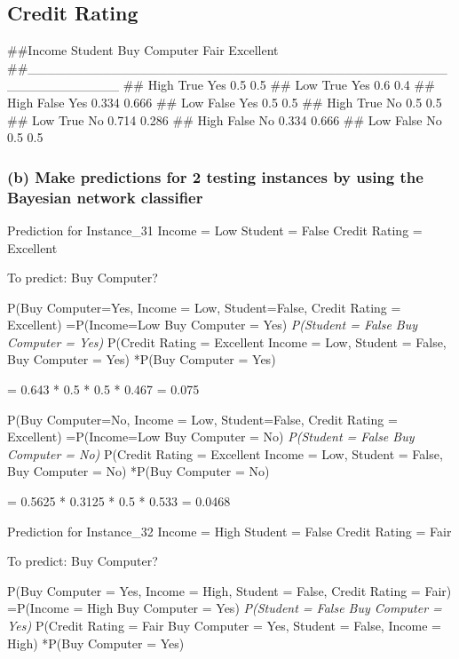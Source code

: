 \documentclass[]{article}
\begin{document}
\hypertarget{credit-rating}{%
\subsection{Credit Rating}\label{credit-rating}}

\#\#Income Student Buy Computer \textbar{} Fair Excellent
\#\#\_\_\_\_\_\_\_\_\_\_\_\_\_\_\_\_\_\_\_\_\_\_\_\_\_\_\_\_\_\_\_\_\_\_\textbar\_\_\_\_\_\_\_\_\_\_\_\_\_\_\_\_\_\_\_\_\_\_\_
\#\# High True Yes \textbar{} 0.5 0.5 \#\# Low True Yes \textbar{} 0.6
0.4 \#\# High False Yes \textbar{} 0.334 0.666 \#\# Low False Yes
\textbar{} 0.5 0.5 \#\# High True No \textbar{} 0.5 0.5 \#\# Low True No
\textbar{} 0.714 0.286 \#\# High False No \textbar{} 0.334 0.666 \#\#
Low False No \textbar{} 0.5 0.5

\hypertarget{b-make-predictions-for-2-testing-instances-by-using-the-bayesian-network-classifier}{%
\subsubsection{(b) Make predictions for 2 testing instances by using the
Bayesian network
classifier}\label{b-make-predictions-for-2-testing-instances-by-using-the-bayesian-network-classifier}}

Prediction for Instance\_31 Income = Low Student = False Credit Rating =
Excellent

To predict: Buy Computer?

P(Buy Computer=Yes, Income = Low, Student=False, Credit Rating =
Excellent) =P(Income=Low \textbar{} Buy Computer = Yes) \emph{P(Student
= False \textbar{} Buy Computer = Yes) }P(Credit Rating =
Excellent\textbar{} Income = Low, Student = False, Buy Computer = Yes)
*P(Buy Computer = Yes)

= 0.643 * 0.5 * 0.5 * 0.467 = 0.075

P(Buy Computer=No, Income = Low, Student=False, Credit Rating =
Excellent) =P(Income=Low \textbar{} Buy Computer = No) \emph{P(Student =
False \textbar{} Buy Computer = No) }P(Credit Rating =
Excellent\textbar{} Income = Low, Student = False, Buy Computer = No)
*P(Buy Computer = No)

= 0.5625 * 0.3125 * 0.5 * 0.533 = 0.0468

Prediction for Instance\_32 Income = High Student = False Credit Rating
= Fair

To predict: Buy Computer?

P(Buy Computer = Yes, Income = High, Student = False, Credit Rating =
Fair) =P(Income = High \textbar{} Buy Computer = Yes) \emph{P(Student =
False \textbar{} Buy Computer = Yes) }P(Credit Rating = Fair \textbar{}
Buy Computer = Yes, Student = False, Income = High) *P(Buy Computer =
Yes)
\end{document}
